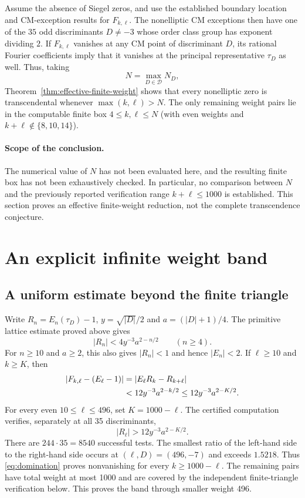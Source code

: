 \documentclass[11pt]{article}
\begin{document}
Assume the absence of Siegel zeros, and use the established boundary
location and CM-exception results for $F_{k,\ell}$.  The nonelliptic
CM exceptions then have one of the $35$ odd discriminants
$D\ne-3$ whose order class group has exponent dividing $2$.
If $F_{k,\ell}$ vanishes at any CM point of discriminant $D$, its
rational Fourier coefficients imply that it vanishes at the principal
representative $\tau_D$ as well.  Thus, taking
\[
 N=\max_{D\in\mathcal D}N_D,
\]
Theorem~\ref{thm:effective-finite-weight} shows that every nonelliptic
zero is transcendental whenever $\max(k,\ell)>N$.
The only remaining weight pairs lie in the computable finite box
$4\leq k,\ell\leq N$ (with even weights and
$k+\ell\notin\{8,10,14\}$).

\paragraph{Scope of the conclusion.}
The numerical value of $N$ has not been evaluated here, and the resulting
finite box has not been exhaustively checked.  In particular, no comparison
between $N$ and the previously reported verification range
$k+\ell\leq1000$ is established.  This section proves an effective
finite-weight reduction, not the complete transcendence conjecture.


\section{An explicit infinite weight band}
\subsection{A uniform estimate beyond the finite triangle}
Write $R_n=E_n(\tau_D)-1$, $y=\sqrt{|D|}/2$ and $a=(|D|+1)/4$. The primitive lattice estimate proved above gives
\begin{equation}\label{eq:bandbound}
 |R_n|<4y^{-3}a^{2-n/2}\qquad(n\ge4).
\end{equation}
For $n\ge10$ and $a\ge2$, this also gives $|R_n|<1$ and hence $|E_n|<2$. If $\ell\ge10$ and $k\ge K$, then
\begin{align}
 |F_{k,\ell}-(E_\ell-1)|
 &=|E_\ell R_k-R_{k+\ell}|\notag\\
 &<12y^{-3}a^{2-k/2}
 \le12y^{-3}a^{2-K/2}.\label{eq:domination}
\end{align}
For every even $10\le\ell\le496$, set $K=1000-\ell$. The certified computation verifies, separately at all 35 discriminants,
\begin{equation}\label{eq:finitebandtest}
 |R_\ell|>12y^{-3}a^{2-K/2}.
\end{equation}
There are $244\cdot35=8540$ successful tests. The smallest ratio of the left-hand side to the right-hand side occurs at $(\ell,D)=(496,-7)$ and exceeds $1.5218$. Thus \eqref{eq:domination} proves nonvanishing for every $k\ge1000-\ell$. The remaining pairs have total weight at most 1000 and are covered by the independent finite-triangle verification below. This proves the band through smaller weight 496.
\end{document}
